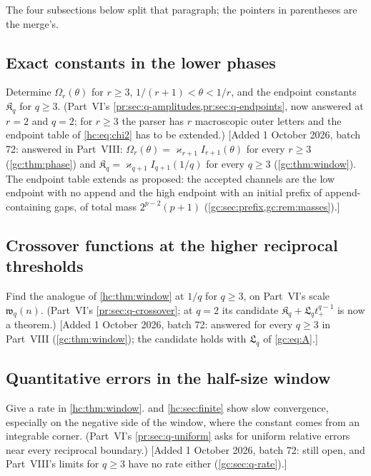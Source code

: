 \documentclass[11pt,a4paper]{article}
\theoremstyle{definition}\newaliascnt{definition}{theorem}
\theoremstyle{remark}\newaliascnt{remark}{theorem}
\begin{document}
The four subsections below split that paragraph; the pointers in
parentheses are the merge's.

\subsection{Exact constants in the lower phases}
\label{hc:sec:q-lower}
Determine $\Omega_r(\theta)$ for $r\ge3$, $1/(r+1)<\theta<1/r$, and the
endpoint constants $\mathfrak K_q$ for $q\ge3$. (Part~VI's
\cref{pr:sec:q-amplitudes,pr:sec:q-endpoints}, now answered at $r=2$ and
$q=2$; for $r\ge3$ the parser has $r$ macroscopic outer letters and the
endpoint table of \eqref{hc:eq:chi2} has to be extended.)
[Added 1 October 2026, batch 72: answered in Part~VIII:
$\Omega_r(\theta)=\varkappa_{r+1}I_{r+1}(\theta)$ for every $r\ge3$
(\cref{gc:thm:phase}) and $\mathfrak K_q=\varkappa_{q+1}I_{q+1}(1/q)$ for
every $q\ge3$ (\cref{gc:thm:window}). The endpoint table extends as
proposed: the accepted channels are the low endpoint with no append and the
high endpoint with an initial prefix of append-containing gaps, of total mass
$2^{p-2}(p+1)$ (\cref{gc:sec:prefix,gc:rem:masses}).]

\subsection{Crossover functions at the higher reciprocal thresholds}
\label{hc:sec:q-higher}
Find the analogue of \cref{hc:thm:window} at $1/q$ for $q\ge3$, on Part~VI's
scale $\mathfrak w_q(n)$. (Part~VI's \cref{pr:sec:q-crossover}; at $q=2$ its
candidate $\mathfrak K_q+\mathfrak L_qt_+^{q-1}$ is now a theorem.)
[Added 1 October 2026, batch 72: answered for every $q\ge3$ in Part~VIII
(\cref{gc:thm:window}); the candidate holds with $\mathfrak L_q$ of
\eqref{gc:eq:A}.]

\subsection{Quantitative errors in the half-size window}
\label{hc:sec:q-errors}
Give a rate in \cref{hc:thm:window}.  and
\cref{hc:sec:finite} show slow convergence, especially on the negative side
of the window, where the constant comes from an integrable corner. (Part~VI's
\cref{pr:sec:q-uniform} asks for uniform relative errors near every
reciprocal boundary.)
[Added 1 October 2026, batch 72: still open, and Part~VIII's limits for
$q\ge3$ have no rate either (\cref{gc:sec:q-rate}).]
\end{document}
